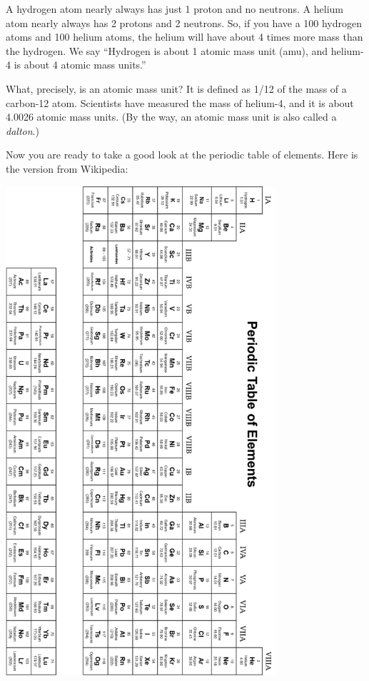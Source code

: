 A hydrogen atom nearly always has just 1 proton and no neutrons. A
helium atom nearly always has 2 protons and 2 neutrons. So, if you
have a 100 hydrogen atoms and 100 helium atoms, the helium will have
about 4 times more mass than the hydrogen. We say ``Hydrogen is about
1 atomic mass unit (amu), and helium-4 is about 4 atomic mass
units.''

What, precisely, is an atomic mass unit? It is defined as 1/12 of
the mass of a carbon-12 atom. Scientists have measured the mass of
helium-4, and it is about 4.0026 atomic mass units. (By the way, an
atomic mass unit is also called a \textit{dalton}.)

\pagebreak

Now you are ready to take a good look at the periodic table of
elements. Here is the version from Wikipedia:

\includegraphics[width=0.75\textwidth]{periodic.png}

